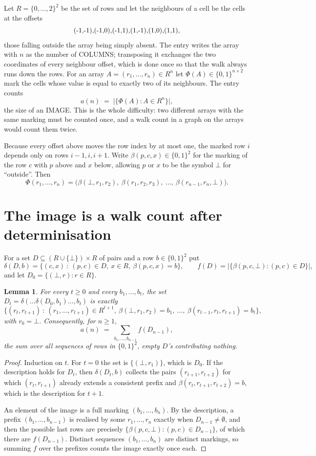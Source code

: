 \documentclass[11pt,a4paper]{article}
\theoremstyle{plain}
\newtheorem{lemma}[theorem]{Lemma}
\theoremstyle{definition}
\begin{document}
Let $R=\{0,\dots,2\}^{2}$ be the set of rows and let the neighbours of a cell be the
cells at the offsets
\[
$(-1,-1)$, $(-1,0)$, $(-1,1)$, $(1,-1)$, $(1,0)$, $(1,1)$,
\]
those falling outside the array being simply absent. The entry writes the array with $n$ as the number of COLUMNS; transposing it exchanges the two coordinates of every neighbour offset, which is done once so that the walk always runs down the rows. For an array
$A=(r_1,\dots,r_n)\in R^n$ let $\Phi(A)\in\{0,1\}^{n\times2}$ mark the cells whose value
is equal to exactly two of its neighbours. The entry counts
\[
a(n)\;=\;\bigl|\{\Phi(A):A\in R^n\}\bigr| ,
\]
the size of an IMAGE. This is the whole difficulty: two different arrays with the same marking
must be counted once, and a walk count in a graph on the arrays would count them twice.

Because every offset above moves the row index by at most one, the marked row $i$ depends only
on rows $i-1,i,i+1$. Write $\beta(p,c,x)\in\{0,1\}^{2}$ for the marking of the row $c$
with $p$ above and $x$ below, allowing $p$ or $x$ to be the symbol $\bot$ for ``outside''.
Then
\[
\Phi(r_1,\dots,r_n)=\bigl(\beta(\bot,r_1,r_2),\ \beta(r_1,r_2,r_3),\ \dots,\
\beta(r_{n-1},r_n,\bot)\bigr).
\]

\section{The image is a walk count after determinisation}

For a set $D\subseteq(R\cup\{\bot\})\times R$ of pairs and a row $b\in\{0,1\}^{2}$ put
\[
\delta(D,b)=\{(c,x)\ :\ (p,c)\in D,\ x\in R,\ \beta(p,c,x)=b\},\qquad
f(D)=\bigl|\{\beta(p,c,\bot):(p,c)\in D\}\bigr| ,
\]
and let $D_0=\{(\bot,r):r\in R\}$.

\begin{lemma}\label{lem:det}
For every $t\ge0$ and every $b_1,\dots,b_t$, the set
$D_t=\delta(\dots\delta(D_0,b_1)\dots,b_t)$ is exactly
\[
\{(r_t,r_{t+1})\ :\ (r_1,\dots,r_{t+1})\in R^{t+1},\ \beta(\bot,r_1,r_2)=b_1,\ \dots,\
\beta(r_{t-1},r_t,r_{t+1})=b_t\} ,
\]
with $r_0=\bot$. Consequently, for $n\ge1$,
\[
a(n)\;=\;\sum_{b_1,\dots,b_{n-1}}f(D_{n-1}),
\]
the sum over all sequences of rows in $\{0,1\}^{2}$, empty $D$'s contributing nothing.
\end{lemma}

\begin{proof}
Induction on $t$. For $t=0$ the set is $\{(\bot,r_1)\}$, which is $D_0$. If the description
holds for $D_t$, then $\delta(D_t,b)$ collects the pairs $(r_{t+1},r_{t+2})$ for which
$(r_t,r_{t+1})$ already extends a consistent prefix and
$\beta(r_t,r_{t+1},r_{t+2})=b$, which is the description for $t+1$.

An element of the image is a full marking $(b_1,\dots,b_n)$. By the description, a prefix
$(b_1,\dots,b_{n-1})$ is realised by some $r_1,\dots,r_n$ exactly when $D_{n-1}\neq
\emptyset$, and then the possible last rows are precisely
$\{\beta(p,c,\bot):(p,c)\in D_{n-1}\}$, of which there are $f(D_{n-1})$. Distinct
sequences $(b_1,\dots,b_n)$ are distinct markings, so summing $f$ over the prefixes counts the
image exactly once each.
\end{proof}
\end{document}
